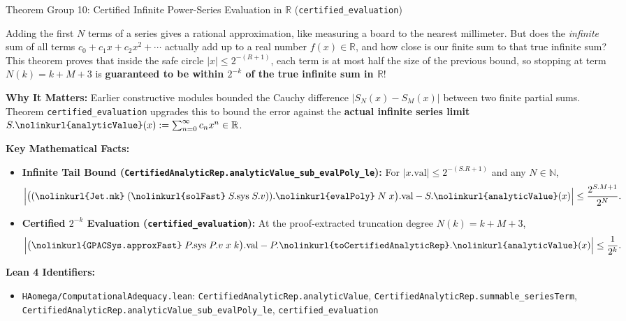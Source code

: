 \documentclass[11pt,a4paper]{article}
\newcommand{\N}{\ensuremath{\mathbb{N}}}
\newcommand{\R}{\ensuremath{\mathbb{R}}}
\newcommand{\lean}[1]{\texttt{\nolinkurl{#1}}}
\begin{document}
\vspace{6pt}

\begin{thmcard}{Theorem Group 10: Certified Infinite Power-Series Evaluation in \texorpdfstring{$\R$}{R} (\lean{certified\_evaluation})}
\begin{eli5box}
Adding the first $N$ terms of a series gives a rational approximation, like measuring a board to the nearest millimeter. But does the \emph{infinite} sum of all terms $c_0 + c_1 x + c_2 x^2 + \cdots$ actually add up to a real number $f(x) \in \R$, and how close is our finite sum to that true infinite sum? This theorem proves that inside the safe circle $|x| \le 2^{-(R+1)}$, each term is at most half the size of the previous bound, so stopping at term $N(k) = k + M + 3$ is \textbf{guaranteed to be within $2^{-k}$ of the true infinite sum in $\R$}!
\end{eli5box}

\textbf{Why It Matters:}
Earlier constructive modules bounded the Cauchy difference $|S_N(x) - S_M(x)|$ between two finite partial sums. Theorem \lean{certified_evaluation} upgrades this to bound the error against the \textbf{actual infinite series limit} $S.\lean{analyticValue}(x) := \sum_{n=0}^\infty c_n x^n \in \R$.

\textbf{Key Mathematical Facts:}
\begin{itemize}
  \item \textbf{Infinite Tail Bound (\lean{CertifiedAnalyticRep.analyticValue_sub_evalPoly_le}):} For $|x.\mathrm{val}| \le 2^{-(S.R+1)}$ and any $N \in \N$,
  \[
    \Bigl|\bigl((\lean{Jet.mk}\;(\lean{solFast}\;S.\mathrm{sys}\;S.v)).\lean{evalPoly}\;N\;x\bigr).\mathrm{val} - S.\lean{analyticValue}(x)\Bigr| \le \frac{2^{S.M+1}}{2^N}.
  \]
  \item \textbf{Certified $2^{-k}$ Evaluation (\lean{certified_evaluation}):} At the proof-extracted truncation degree $N(k) = k + M + 3$,
  \[
    \Bigl|\bigl(\lean{GPACSys.approxFast}\;P.\mathrm{sys}\;P.v\;x\;k\bigr).\mathrm{val} - P.\lean{toCertifiedAnalyticRep}.\lean{analyticValue}(x)\Bigr| \le \frac{1}{2^k}.
  \]
\end{itemize}

\textbf{Lean 4 Identifiers:}
\begin{itemize}
  \item \lean{HAomega/ComputationalAdequacy.lean}: \lean{CertifiedAnalyticRep.analyticValue}, \lean{CertifiedAnalyticRep.summable_seriesTerm}, \lean{CertifiedAnalyticRep.analyticValue_sub_evalPoly_le}, \lean{certified_evaluation}
\end{itemize}
\end{thmcard}
\end{document}
